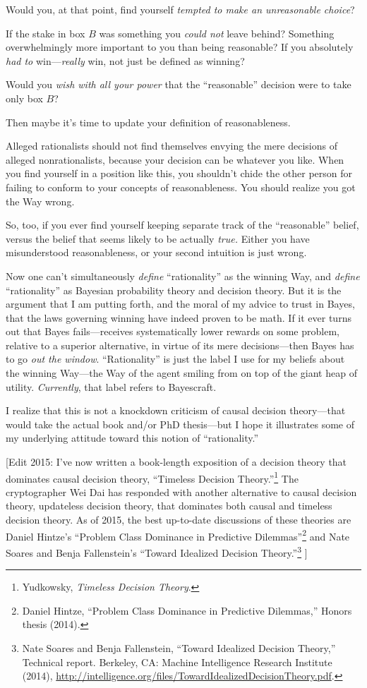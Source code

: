 {
 Would you, at that point, find yourself \textit{tempted to make an
unreasonable choice}?}

{
 If the stake in box $B$ was something you \textit{could not} leave
behind? Something overwhelmingly more important to you than being
reasonable? If you absolutely \textit{had to} win---\textit{really}
win, not just be defined as winning?}

{
 Would you \textit{wish with all your power} that the
``reasonable'' decision were to take
only box $B$?}

{
 Then maybe it's time to update your definition of
reasonableness.}

{
 Alleged rationalists should not find themselves envying the mere
decisions of alleged nonrationalists, because your decision can be
whatever you like. When you find yourself in a position like this, you
shouldn't chide the other person for failing to conform
to your concepts of reasonableness. You should realize you got the Way
wrong.}

{
 So, too, if you ever find yourself keeping separate track of the
``reasonable'' belief, versus the
belief that seems likely to be actually \textit{true.} Either you have
misunderstood reasonableness, or your second intuition is just wrong.}

{
 Now one can't simultaneously \textit{define}
``rationality'' as the winning Way,
and \textit{define} ``rationality''
as Bayesian probability theory and decision theory. But it is the
argument that I am putting forth, and the moral of my advice to trust
in Bayes, that the laws governing winning have indeed proven to be
math. If it ever turns out that Bayes fails---receives systematically
lower rewards on some problem, relative to a superior alternative, in
virtue of its mere decisions---then Bayes has to go \textit{out the
window}. ``Rationality'' is just the
label I use for my beliefs about the winning Way---the Way of the agent
smiling from on top of the giant heap of utility. \textit{Currently},
that label refers to Bayescraft.}

{
 I realize that this is not a knockdown criticism of causal
decision theory---that would take the actual book and/or PhD
thesis---but I hope it illustrates some of my underlying attitude
toward this notion of
``rationality.''}

{
 [Edit 2015: I've now written a book-length
exposition of a decision theory that dominates causal decision theory,
``Timeless Decision
Theory.''\footnote{Yudkowsky, \textit{Timeless Decision Theory}.} The cryptographer Wei
Dai has responded with another alternative to causal decision theory,
updateless decision theory, that dominates both causal and timeless
decision theory. As of 2015, the best up-to-date discussions of these
theories are Daniel Hintze's ``Problem
Class Dominance in Predictive
Dilemmas''\footnote{Daniel Hintze, ``Problem Class Dominance in
Predictive Dilemmas,'' Honors thesis (2014).} and Nate Soares and
Benja Fallenstein's ``Toward Idealized
Decision Theory.''\footnote{Nate Soares and Benja Fallenstein, ``Toward
Idealized Decision Theory,'' Technical report.
Berkeley, CA: Machine Intelligence Research Institute (2014),
\url{http://intelligence.org/files/TowardIdealizedDecisionTheory.pdf}.} ]}

